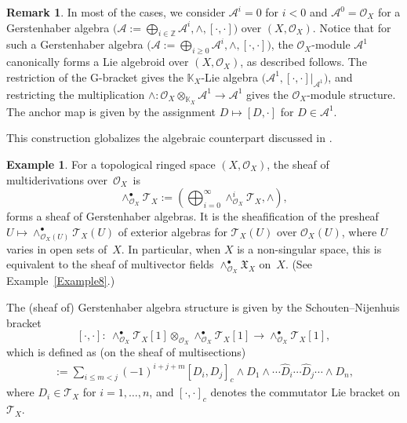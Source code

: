 \documentclass[pdftex]{sigma}
\numberwithin{equation}{section}
\theoremstyle{definition}
\newtheorem{Exm}[Thm]{Example}
\newtheorem{Rem}[Thm]{Remark}
\begin{document}
\begin{Rem} \label{G-alg to Lie alg} In most of the cases, we consider $\mathcal{A}^i=0$ for $i<0$ and $\mathcal{A}^0=\mathcal{O}_X$ for a Gerstenhaber algebra $\bigl(\mathcal{A}:=\bigoplus_{i \in \mathbb{Z}} \mathcal{A}^i, \wedge, [\cdot, \cdot]\bigr)$ over $(X, \mathcal{O}_X)$.
	Notice that for such a Gerstenhaber algebra $\bigl(\mathcal{A} := \bigoplus_{i \geq 0} \mathcal{A}^i, \wedge, [\cdot, \cdot]\bigr)$, the $\mathcal{O}_X$-module $\mathcal{A}^1$ canonically forms a Lie algebroid over $(X, \mathcal{O}_X)$, as described follows. The restriction of the G-bracket gives the $\mathbb{K}_X$-Lie algebra $\bigl(\mathcal{A}^1, [\cdot, \cdot]|_{\mathcal{A}^1}\bigr)$, and restricting the multiplication $\wedge\colon \mathcal{O}_X \otimes_{\mathbb{K}_X} \mathcal{A}^1 \rightarrow \mathcal{A}^1$ gives the $\mathcal{O}_X$-module structure. The anchor map is given by the assignment $D \mapsto [D, \cdot]$ for $D \in \mathcal{A}^1$.
	
	This construction globalizes the algebraic counterpart discussed in \cite{MG-SS, JH2}.
\end{Rem}
\begin{Exm} \label{multivector fields}
	For a topological ringed space $(X, \mathcal{O}_X)$, the sheaf of multiderivations over~$\mathcal{O}_X$~is
\[
\wedge^\bullet_{\mathcal{O}_X}\mathcal{T}_X := \left(\bigoplus^{\infty}_{i=0} \wedge_{\mathcal{O}_X}^i \mathcal{T}_X, \wedge \right),
\]
 forms a sheaf of Gerstenhaber algebras. It is the sheafification of the presheaf $U \mapsto \wedge^\bullet_{\mathcal{O}_X(U)} \mathcal{T}_X(U)$ of exterior algebras for $\mathcal{T}_X(U)$ over $\mathcal{O}_X(U)$, where $U$ varies in open sets of~$X$.
	In particular, when $X$ is a non-singular space, this is equivalent to the sheaf of multivector fields $\wedge^\bullet_{\mathcal{O}_X}\mathfrak{X}_X$ on~$X$. (See Example~\ref{Example8}.)
	
	The (sheaf of) Gerstenhaber algebra structure is given by the Schouten--Nijenhuis bracket
\[
[\cdot,\cdot]\colon \
\wedge^\bullet_{\mathcal{O}_X}\mathcal{T}_X[1]
\otimes_{\mathcal{O}_X}
\wedge^\bullet_{\mathcal{O}_X}\mathcal{T}_X[1]
\rightarrow
\wedge^\bullet_{\mathcal{O}_X}\mathcal{T}_X[1],
\]
	which is defined as (on the sheaf of multisections)
\begin{gather*}
	[D_1\! \wedge \cdots \wedge D_m, D_{m+1}\! \wedge \cdots \wedge D_n] :=
\!\sum_{i \leq m < j}\!\! (-1)^{i+j+m}[D_i, D_j]_c \wedge D_1\! \wedge \cdots \hat{D}_i \cdots \hat{D}_j \cdots \wedge D_n,
\end{gather*}
	where $D_i \in \mathcal{T}_X$ for $i = 1, \dots, n$, and $[\cdot, \cdot]_c$ denotes the commutator Lie bracket on $\mathcal{T}_X$.
\end{Exm}
\end{document}
